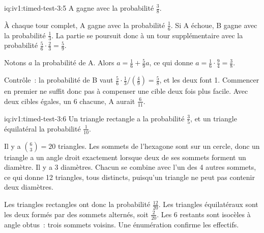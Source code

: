 \begin{solution}{iq:iv1:timed-test-3:5}
A gagne avec la probabilité $\frac38$.

À chaque tour complet, A gagne avec la probabilité $\frac16$. Si A échoue, B gagne avec la probabilité $\frac13$. La partie se poursuit donc à un tour supplémentaire avec la probabilité $\frac56 \cdot \frac23 = \frac59$.

Notons $a$ la probabilité de A. Alors $a = \frac16 + \frac59a$, ce qui donne $a = \frac16 \cdot \frac94 = \frac38$.

Contrôle~: la probabilité de B vaut $\frac56 \cdot \frac13/(\frac49) = \frac58$, et les deux font 1. Commencer en premier ne suffit donc pas à compenser une cible deux fois plus facile. Avec deux cibles égales, un 6 chacune, A aurait $\frac{6}{11}$.

\end{solution}

\begin{solution}{iq:iv1:timed-test-3:6}
Un triangle rectangle a la probabilité $\frac35$, et un triangle équilatéral la probabilité $\frac{1}{10}$.

Il y a $\binom63 = 20$ triangles. Les sommets de l'hexagone sont sur un cercle, donc un triangle a un angle droit exactement lorsque deux de ses sommets forment un diamètre. Il y a 3 diamètres. Chacun se combine avec l'un des 4 autres sommets, ce qui donne 12 triangles, tous distincts, puisqu'un triangle ne peut pas contenir deux diamètres.

Les triangles rectangles ont donc la probabilité $\frac{12}{20}$. Les triangles équilatéraux sont les deux formés par des sommets alternés, soit $\frac{2}{20}$. Les 6 restants sont isocèles à angle obtus~: trois sommets voisins. Une énumération confirme les effectifs.

\end{solution}

